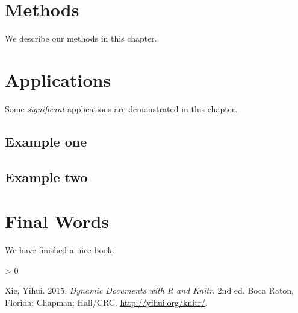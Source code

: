 \documentclass[
  12pt,
  a4paper,
  twoside]{book}
\newlength{\cslhangindent}
\newenvironment{CSLReferences}[2] %
 {%
  \setlength{\parindent}{0pt}
  \ifodd #1 \everypar{\setlength{\hangindent}{\cslhangindent}}\ignorespaces\fi
  \ifnum #2 > 0
  \setlength{\parskip}{#2\baselineskip}
  \fi
 }%
 {}
\begin{document}
\hypertarget{methods}{%
\chapter{Methods}\label{methods}}

We describe our methods in this chapter.

\hypertarget{applications}{%
\chapter{Applications}\label{applications}}

Some \emph{significant} applications are demonstrated in this chapter.

\hypertarget{example-one}{%
\section{Example one}\label{example-one}}

\hypertarget{example-two}{%
\section{Example two}\label{example-two}}

\hypertarget{final-words}{%
\chapter{Final Words}\label{final-words}}

We have finished a nice book.

\hypertarget{refs}{}
\begin{CSLReferences}{1}{0}
\leavevmode\hypertarget{ref-xie2015}{}%
Xie, Yihui. 2015. \emph{Dynamic Documents with {R} and Knitr}. 2nd ed. Boca Raton, Florida: Chapman; Hall/CRC. \url{http://yihui.org/knitr/}.

\end{CSLReferences}
\end{document}
